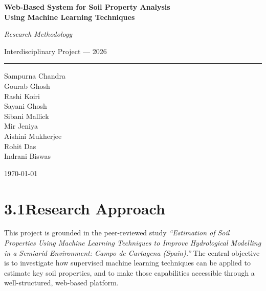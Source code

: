 \documentclass[12pt,a4paper]{article}
\begin{document}
\begin{titlepage}
  \centering
  \vspace*{2.5cm}

  {\LARGE\bfseries
    Web-Based System for Soil Property Analysis\\[0.5em]
    Using Machine Learning Techniques\par}

  \vspace{1.2cm}
  {\large\itshape Research Methodology\par}

  \vspace{0.4cm}
  {\normalsize Interdisciplinary Project --- 2026\par}

  \vspace{1.8cm}
  \rule{0.55\textwidth}{1pt}
  \vspace{1.4cm}

  {\large
    Sampurna Chandra\\[0.3em]
    Gourab Ghosh\\[0.3em]
    Rashi Koiri\\[0.3em]
    Sayani Ghosh\\[0.3em]
    Sibani Mallick\\[0.3em]
    Mir Jeniya\\[0.3em]
    Aishini Mukherjee\\[0.3em]
    Rohit Das\\[0.3em]
    Indrani Biswas\par}

  \vfill
  {\small \today}
\end{titlepage}

\tableofcontents
\newpage

\section{3.1\quad Research Approach}

This project is grounded in the peer-reviewed study \textit{``Estimation of
Soil Properties Using Machine Learning Techniques to Improve Hydrological
Modelling in a Semiarid Environment: Campo de Cartagena (Spain).''} The
central objective is to investigate how supervised machine learning techniques
can be applied to estimate key soil properties, and to make those capabilities
accessible through a well-structured, web-based platform.
\end{document}
